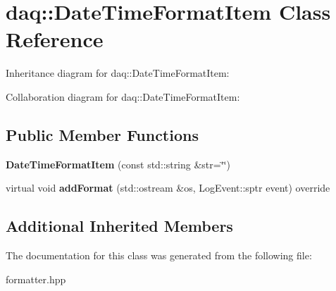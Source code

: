 \hypertarget{classdaq_1_1DateTimeFormatItem}{}\section{daq\+:\+:Date\+Time\+Format\+Item Class Reference}
\label{classdaq_1_1DateTimeFormatItem}


Inheritance diagram for daq\+:\+:Date\+Time\+Format\+Item\+:


Collaboration diagram for daq\+:\+:Date\+Time\+Format\+Item\+:
\subsection*{Public Member Functions}
\begin{DoxyCompactItemize}
\item 
\mbox{\label{classdaq_1_1DateTimeFormatItem_ac821845d3b51f84930358a879ed12076}} 
{\bfseries Date\+Time\+Format\+Item} (const std\+::string \&str=\char`\"{}\char`\"{})
\item 
\mbox{\label{classdaq_1_1DateTimeFormatItem_a4644c4ca0dff2e0cf63db73defd88211}} 
virtual void {\bfseries add\+Format} (std\+::ostream \&os, Log\+Event\+::sptr event) override
\end{DoxyCompactItemize}
\subsection*{Additional Inherited Members}


The documentation for this class was generated from the following file\+:\begin{DoxyCompactItemize}
\item 
formatter.\+hpp\end{DoxyCompactItemize}
